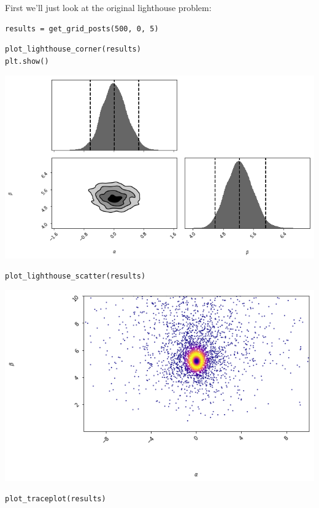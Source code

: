 \documentclass[11pt]{article}
\begin{document}
First we'll just look at the original lighthouse problem:

\begin{verbatim}
results = get_grid_posts(500, 0, 5)
\end{verbatim}


\begin{verbatim}
plot_lighthouse_corner(results)
plt.show()
\end{verbatim}

\includegraphics[width=.9\linewidth]{./obipy-resources/692Ghy.png}

\begin{verbatim}
plot_lighthouse_scatter(results)
\end{verbatim}

\includegraphics[width=.9\linewidth]{./obipy-resources/6924qB.png}

\begin{verbatim}
plot_traceplot(results)
\end{verbatim}
\end{document}

